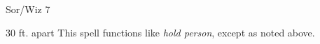 
\begin{description*}
\item[Level:] Sor/Wiz 7
\end{description*}

30 ft. apart
This spell functions like \textit{hold person}, except as noted above.